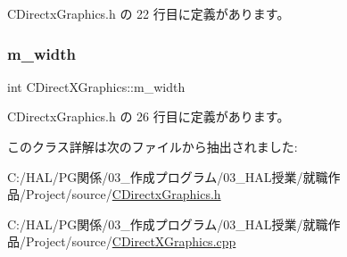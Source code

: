  C\+Directx\+Graphics.\+h の 22 行目に定義があります。

\mbox{\label{class_c_direct_x_graphics_a0dd76eb8c73ed2682dec9f013a48a6f2}} 
\subsubsection{\texorpdfstring{m\+\_\+width}{m\_width}}
{\footnotesize\ttfamily int C\+Direct\+X\+Graphics\+::m\+\_\+width\hspace{0.3cm}{\ttfamily [private]}}



 C\+Directx\+Graphics.\+h の 26 行目に定義があります。



このクラス詳解は次のファイルから抽出されました\+:\begin{DoxyCompactItemize}
\item 
C\+:/\+H\+A\+L/\+P\+G関係/03\+\_\+作成プログラム/03\+\_\+\+H\+A\+L授業/就職作品/\+Project/source/\mbox{\hyperlink{_c_directx_graphics_8h}{C\+Directx\+Graphics.\+h}}\item 
C\+:/\+H\+A\+L/\+P\+G関係/03\+\_\+作成プログラム/03\+\_\+\+H\+A\+L授業/就職作品/\+Project/source/\mbox{\hyperlink{_c_direct_x_graphics_8cpp}{C\+Direct\+X\+Graphics.\+cpp}}\end{DoxyCompactItemize}

